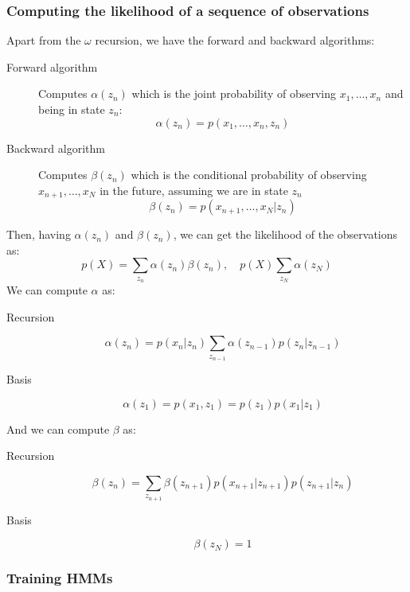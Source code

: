     \subsubsection{Computing the likelihood of a sequence of observations}
    Apart from the $\omega$ recursion, we have the forward and backward 
    algorithms:
    \begin{description}
        \item[Forward algorithm] Computes $\alpha(z_n)$ which is the joint 
        probability of observing $x_1,\dots,x_n$ and being in state $z_n$:
        \begin{equation*}
            \alpha(z_n)=p(x_1,\dots,x_n,z_n)
        \end{equation*}
        \item[Backward algorithm] Computes $\beta(z_n)$ which is the 
        conditional probability of observing $x_{n+1},\dots,x_N$ in the future, 
        assuming we are in state $z_n$
        \begin{equation*}
            \beta(z_n)=p(x_{n+1},\dots,x_N|z_n)
        \end{equation*}
    \end{description}
    Then, having $\alpha(z_n)$ and $\beta(z_n)$, we can get the likelihood of 
    the observations as:
    \begin{equation*}
        p(X)=\sum_{z_n}\alpha(z_n)\beta(z_n), \quad p(X)\sum_{z_N}\alpha(z_N)
    \end{equation*}
    We can compute $\alpha$ as:
    \begin{description}
        \item[Recursion]
        \begin{equation*}
            \alpha(z_n)=p(x_n|z_n) \sum_{z_{n-1}} \alpha(z_{n-1})p(z_n|z_{n-1})
        \end{equation*}
        \item[Basis]
        \begin{equation*}
            \alpha(z_1)=p(x_1,z_1)=p(z_1)p(x_1|z_1)
        \end{equation*}
    \end{description}
    And we can compute $\beta$ as:
    \begin{description}
        \item[Recursion]
        \begin{equation*}
        \beta(z_n)=\sum_{z_{n+1}} 
        \beta(z_{n+1})p(x_{n+1}|z_{n+1})p(z_{n+1}|z_{n})
        \end{equation*}
        \item[Basis]
        \begin{equation*}
        \beta(z_N)=1
        \end{equation*}
    \end{description}
    
    \subsubsection{Training HMMs}
    

